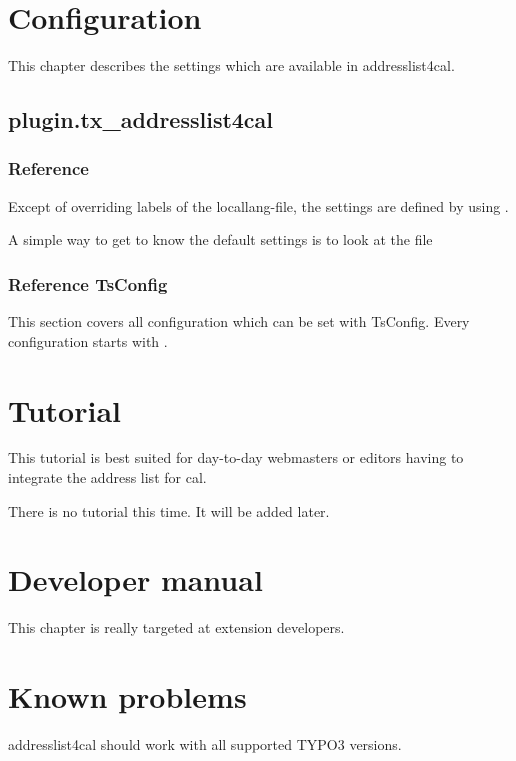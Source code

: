 \documentclass[a4paper,10pt,english]{sphinxtypo3manual}
\begin{document}
\chapter{Configuration}
\label{index:configuration}
This chapter describes the settings which are available in addresslist4cal.


\section{plugin.tx\_addresslist4cal}
\label{index:plugin-tx-addresslist4cal}

\subsection{Reference}
\label{index:reference}
Except of overriding labels of the locallang-file, the settings are defined by using
.

A simple way to get to know the default settings is to look at the
file 


\subsection{Reference TsConfig}
\label{index:reference-tsconfig}
This section covers all configuration which can be set with TsConfig.
Every configuration starts with .


\chapter{Tutorial}
\label{index:tutorial}
This tutorial is best suited for day-to-day webmasters or editors having to integrate the address list for cal.

There is no tutorial this time. It will be added later.


\chapter{Developer manual}
\label{index:developer-manual}
This chapter is really targeted at extension developers.


\chapter{Known problems}
\label{index:known-problems}
addresslist4cal should work with all supported TYPO3 versions.
\end{document}
